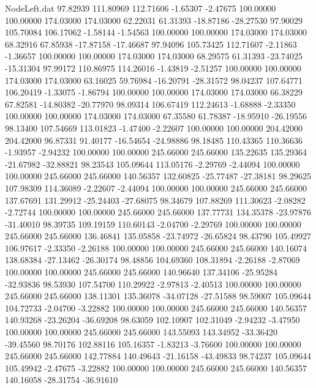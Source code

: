 \begin{filecontents}{NodeLeft.dat}
  97.82939  111.80969  112.71606    -1.65307   -2.47675  100.00000  100.00000  174.03000  174.03000   62.22031   61.31393  -18.87186  -28.27530
  97.90029  105.70084  106.17062    -1.58144   -1.54563  100.00000  100.00000  174.03000  174.03000   68.32916   67.85938  -17.87158  -17.46687
  97.94096  105.73425  112.71607    -2.11863   -1.36657  100.00000  100.00000  174.03000  174.03000   68.29575   61.31393  -23.74025  -15.31304
  97.99172  110.86975  114.26016    -1.43819   -2.51257  100.00000  100.00000  174.03000  174.03000   63.16025   59.76984  -16.20791  -28.31572
  98.04237  107.64771  106.20419    -1.33075   -1.86794  100.00000  100.00000  174.03000  174.03000   66.38229   67.82581  -14.80382  -20.77970
  98.09314  106.67419  112.24613    -1.68888   -2.33350  100.00000  100.00000  174.03000  174.03000   67.35580   61.78387  -18.95910  -26.19556
  98.13400  107.54669  113.01823    -1.47400   -2.22607  100.00000  100.00000  204.42000  204.42000   96.87331   91.40177  -16.54654  -24.98886
  98.18485  110.43365  110.36636    -1.93957   -2.94232  100.00000  100.00000  245.66000  245.66000  135.22635  135.29364  -21.67982  -32.88821
  98.23543  105.09644  113.05176    -2.29769   -2.44094  100.00000  100.00000  245.66000  245.66000  140.56357  132.60825  -25.77487  -27.38181
  98.29625  107.98309  114.36089    -2.22607   -2.44094  100.00000  100.00000  245.66000  245.66000  137.67691  131.29912  -25.24403  -27.68075
  98.34679  107.88269  111.30623    -2.08282   -2.72744  100.00000  100.00000  245.66000  245.66000  137.77731  134.35378  -23.97876  -31.40010
  98.39735  109.19159  110.60143    -2.04700   -2.29769  100.00000  100.00000  245.66000  245.66000  136.46841  135.05858  -23.74972  -26.65824
  98.43790  105.49927  106.97617    -2.33350   -2.26188  100.00000  100.00000  245.66000  245.66000  140.16074  138.68384  -27.13462  -26.30174
  98.48856  104.69360  108.31894    -2.26188   -2.87069  100.00000  100.00000  245.66000  245.66000  140.96640  137.34106  -25.95284  -32.93836
  98.53930  107.54700  110.29922    -2.97813   -2.40513  100.00000  100.00000  245.66000  245.66000  138.11301  135.36078  -34.07128  -27.51588
  98.59007  105.09644  104.72733    -2.04700   -3.22882  100.00000  100.00000  245.66000  245.66000  140.56357  140.93268  -23.26204  -36.69208
  98.63059  102.10907  102.31049    -2.94232   -3.47950  100.00000  100.00000  245.66000  245.66000  143.55093  143.34952  -33.36420  -39.45560
  98.70176  102.88116  105.16357    -1.83213   -3.76600  100.00000  100.00000  245.66000  245.66000  142.77884  140.49643  -21.16158  -43.49833
  98.74237  105.09644  105.49942    -2.47675   -3.22882  100.00000  100.00000  245.66000  245.66000  140.56357  140.16058  -28.31754  -36.91610

\end{filecontents}
